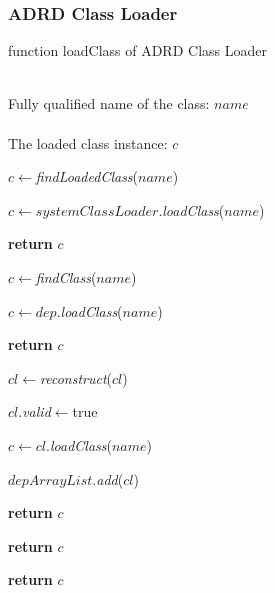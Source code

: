 \documentclass[conference]{IEEEtran}
\begin{document}
\subsubsection{ADRD Class Loader}

\begin{algorithm}[h]
\caption{function loadClass of ADRD Class Loader}
\label{alg:ADRD_Class_Loader}
\begin{algorithmic}[1]
\REQUIRE ~~\\
Fully qualified name of the class: $name$ \\

\ENSURE ~~\\
The loaded class instance: $c$

\STATE $c\leftarrow$\emph{findLoadedClass}($name$)

	
	
		\STATE $c\leftarrow systemClassLoader.$\emph{loadClass}($name$)
	

			\STATE \textbf{return} $c$
	
		\ENDIF

	\ELSE

		\STATE $c\leftarrow$\emph{findClass}($name$)



				\STATE $c\leftarrow dep.$\emph{loadClass}($name$)

			
					\STATE \textbf{return} $c$

				\ENDIF
			
			\ENDFOR

				


					\STATE $cl\leftarrow$\emph{reconstruct}($cl$)
				
					\STATE $cl.$\emph{valid}$\leftarrow$true

				\ENDIF

				\STATE $c\leftarrow cl.$\emph{loadClass}($name$)


					\STATE $depArrayList$.\emph{add}($cl$)
			
					\STATE \textbf{return} $c$

				\ENDIF
			
			\ENDFOR
	
	
		\ELSE

			\STATE \textbf{return} $c$

		\ENDIF

	\ENDIF

\ELSE

	\STATE \textbf{return} $c$

\ENDIF


\end{algorithmic}
\end{algorithm}
\end{document}
